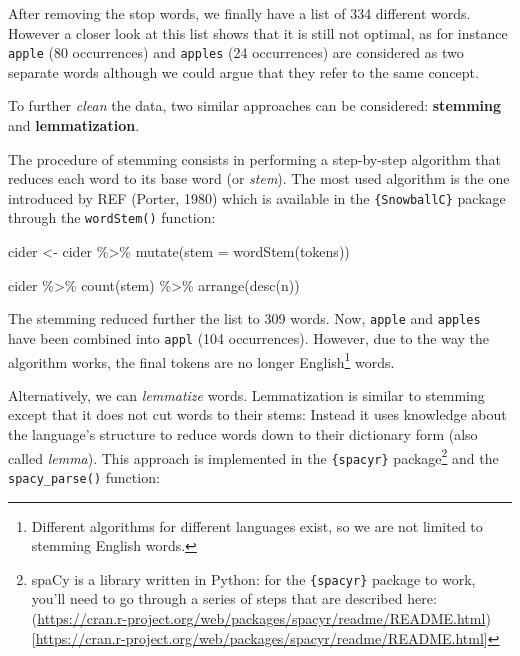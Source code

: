 \documentclass[
]{book}
\newenvironment{Shaded}{\begin{snugshade}}{\end{snugshade}}
\newcommand{\AttributeTok}[1]{\textcolor[rgb]{0.77,0.63,0.00}{#1}}
\newcommand{\FunctionTok}[1]{\textcolor[rgb]{0.00,0.00,0.00}{#1}}
\newcommand{\NormalTok}[1]{#1}
\newcommand{\OtherTok}[1]{\textcolor[rgb]{0.56,0.35,0.01}{#1}}
\newcommand{\SpecialCharTok}[1]{\textcolor[rgb]{0.00,0.00,0.00}{#1}}
\begin{document}
After removing the stop words, we finally have a list of 334 different words. However a closer look at this list shows that it is still not optimal, as for instance \texttt{apple} (80 occurrences) and \texttt{apples} (24 occurrences) are considered as two separate words although we could argue that they refer to the same concept.

To further \emph{clean} the data, two similar approaches can be considered: \textbf{stemming} and \textbf{lemmatization}.

The procedure of stemming consists in performing a step-by-step algorithm that reduces each word to its base word (or \emph{stem}). The most used algorithm is the one introduced by REF (Porter, 1980) which is available in the \texttt{\{SnowballC\}} package through the \texttt{wordStem()} function:

\begin{Shaded}
\begin{Highlighting}[]
\NormalTok{cider }\OtherTok{\textless{}{-}}\NormalTok{ cider }\SpecialCharTok{\%\textgreater{}\%} 
  \FunctionTok{mutate}\NormalTok{(}\AttributeTok{stem =} \FunctionTok{wordStem}\NormalTok{(tokens))}

\NormalTok{cider }\SpecialCharTok{\%\textgreater{}\%} 
  \FunctionTok{count}\NormalTok{(stem) }\SpecialCharTok{\%\textgreater{}\%} 
  \FunctionTok{arrange}\NormalTok{(}\FunctionTok{desc}\NormalTok{(n))}
\end{Highlighting}
\end{Shaded}

The stemming reduced further the list to 309 words. Now, \texttt{apple} and \texttt{apples} have been combined into \texttt{appl} (104 occurrences). However, due to the way the algorithm works, the final tokens are no longer English\footnote{Different algorithms for different languages exist, so we are not limited to stemming English words.} words.

Alternatively, we can \emph{lemmatize} words. Lemmatization is similar to stemming except that it does not cut words to their stems: Instead it uses knowledge about the language's structure to reduce words down to their dictionary form (also called \emph{lemma}). This approach is implemented in the \texttt{\{spacyr\}} package\footnote{spaCy is a library written in Python: for the \texttt{\{spacyr\}} package to work, you'll need to go through a series of steps that are described here: (\url{https://cran.r-project.org/web/packages/spacyr/readme/README.html}){[}\url{https://cran.r-project.org/web/packages/spacyr/readme/README.html}{]}} and the \texttt{spacy\_parse()} function:
\end{document}
